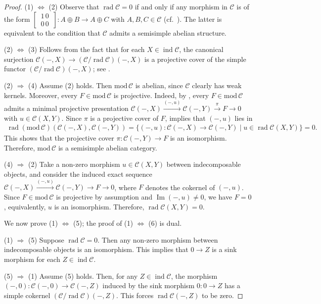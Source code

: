 \documentclass[12pt]{amsart}
\numberwithin{equation}{subsection}
\theoremstyle{plain}
\theoremstyle{definition}
\renewcommand{\Im}{\operatorname{Im}}
\newcommand{\rad}{\operatorname{rad}}
\renewcommand{\mod}{\mathrm{mod}\,}
\newcommand{\ind}{\operatorname{ind}}
\newcommand{\C}{\mathcal{C}}
\begin{document}
\begin{proof}
(1) $\Leftrightarrow$ (2)
Observe that $\rad\C=0$ if and only if any morphism in $\C$ is of the form $\left[\substack{\,1\,0\,\\[.5mm]\,0\,0\,}\right] : A \oplus B \to A \oplus C$ with $A,B,C\in\C$ (cf.~\cite[Proposition 3.1]{Rump_2022}).
The latter is equivalent to the condition that $\C$ admits a semisimple abelian structure.





(2) $\Leftrightarrow$ (3)
Follows from the fact that for each $X\in\ind\C$, the canonical surjection $\C(-, X)\to (\C/\rad\C)(-, X)$ is a projective cover of the simple functor $(\C/\rad\C)(-, X)$; see .



(2) $\Rightarrow$ (4) 
Assume (2) holds. 
Then $\mod\C$ is abelian, since $\C$ clearly has weak kernels.
Moreover, every $F \in \mod\C$ is projective.
Indeed, by \cite[Proposition A.1]{Krause_2012}, every $F\in\mod\C$ admits a minimal projective presentation $\C(-, X)\xrightarrow{(-, u)} \C(-, Y) \xrightarrow{\pi} F \to 0$ with $u \in\C(X, Y)$.
Since $\pi$ is a projective cover of $F$,  \cite[Proposition 3.10]{Krause_2015} implies that $(-, u)$ lies in 
\begin{align}
    \rad(\mod\C)(\C(-, X), \C(-, Y)) =\{(-, u):\C(-, X) \to \C(-, Y) \mid u \in \rad\C(X, Y)\}
    =0.
\end{align}
This shows that the projective cover $\pi: \C(-, Y) \to F$ is an isomorphism.
Therefore, $\mod\C$ is a semisimple abelian category.




(4) $\Rightarrow$ (2)
Take a non-zero morphism $u\in\C(X, Y)$ between indecomposable objects, and consider the induced exact sequence $\C(-, X)\xrightarrow{(-,u)}\C(-, Y) \to F\to 0$, where $F$ denotes the cokernel of $(-,u)$.
Since $F\in\mod\C$ is projective by assumption and $\Im(-,u)\neq 0$, we have $F=0$, equivalently, $u$ is an isomorphism. 
Therefore, $\rad\C(X, Y) = 0$.





We now prove (1) $\Leftrightarrow$ (5); the proof of (1) $\Leftrightarrow$ (6) is dual.



(1) $\Rightarrow$ (5)
Suppose $\rad\C=0$.
Then any non-zero morphism between indecomposable objects is an isomorphism.
This implies that $0\to Z$ is a sink morphism for each $Z\in \ind\C$.



(5) $\Rightarrow$ (1)
Assume (5) holds.
Then, for any $Z \in\ind\C$, the morphism $(-, 0) : \C(-, 0) \to \C(-, Z)$ induced by the sink morphism $0: 0 \to Z$ has a simple cokernel $(\C/\rad\C)(-, Z)$.
This forces $\rad\C(-, Z)$ to be zero.
\end{proof}
\end{document}
